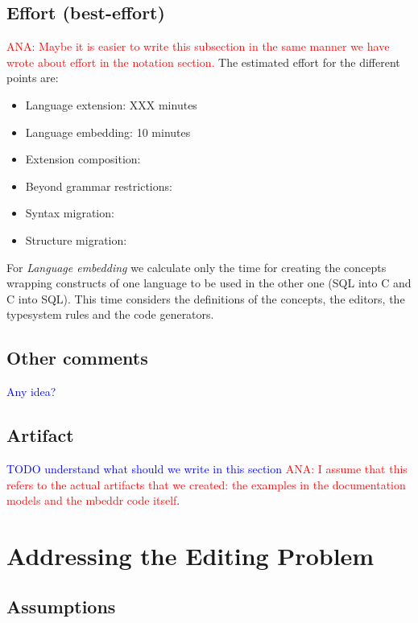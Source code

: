\documentclass[preprint,numbers,10pt]{sigplanconf}
\newcommand\comment[1]{\textcolor{blue}{#1}}
\newcommand\ana[1]{\textcolor{red}{ANA: {#1}}}
\begin{document}
\subsection{Effort (best-effort)}
\ana{Maybe it is easier to write this subsection in the same manner we have wrote about effort in the notation section.}
The estimated effort for the different points are:

\begin{itemize}
	\item Language extension: XXX minutes
	\item Language embedding: 10 minutes
	\item Extension composition:
	\item Beyond grammar restrictions:
	\item Syntax migration:
	\item Structure migration:
\end{itemize}

For \emph{Language embedding} we calculate only the time for creating the
concepts wrapping constructs of one language to be used in the other one (SQL
into C and C into SQL). This time considers the definitions of the concepts, the
editors, the typesystem rules and the code generators.

\subsection{Other comments}

\comment{Any idea?}

\subsection{Artifact}

\comment{TODO understand what should we write in this section}
\ana{I assume that this refers to the actual artifacts that we created: the
examples in the documentation models and the mbeddr code itself}.

%
%

\section{Addressing the Editing Problem}

\subsection{Assumptions}
\end{document}
